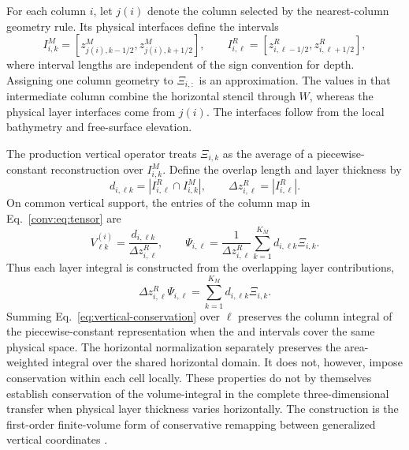 For each \ROMS column $i$, let $j(i)$ denote the \MPAS column selected
by the nearest-column geometry rule. Its physical interfaces define the
\MPAS intervals
\begin{equation}
 I^M_{i,k}=[z^M_{j(i),k-1/2},z^M_{j(i),k+1/2}],
 \qquad
 I^R_{i,\ell}=[z^R_{i,\ell-1/2},z^R_{i,\ell+1/2}],
 \label{eq:vertical-intervals}
\end{equation}
where interval lengths are independent of the sign convention for depth.
Assigning one \MPAS column geometry to $\Xi_{i,:}$ is an approximation.
The values in that intermediate column combine the horizontal stencil
through $W$, whereas the physical layer interfaces come from $j(i)$. The
\ROMS interfaces follow from the local \ROMS bathymetry and free-surface
elevation.

The production vertical operator treats $\Xi_{i,k}$ as the average of a
piecewise-constant reconstruction over $I^M_{i,k}$. Define the overlap
length and \ROMS layer thickness by
\begin{equation}
 d_{i,\ell k}=|I^R_{i,\ell}\cap I^M_{i,k}|,
 \qquad \Delta z^R_{i,\ell}=|I^R_{i,\ell}|.
 \label{eq:vertical-overlap}
\end{equation}
On common vertical support, the entries of the column map in
Eq.~\eqref{conv:eq:tensor} are
\begin{equation}
 V^{(i)}_{\ell k}=\frac{d_{i,\ell k}}{\Delta z^R_{i,\ell}},
 \qquad
 \Psi_{i,\ell}=\frac{1}{\Delta z^R_{i,\ell}}
   \sum_{k=1}^{K_M}d_{i,\ell k}\Xi_{i,k}.
 \label{eq:vertical-map}
\end{equation}
Thus each \ROMS layer integral is constructed from the overlapping
\MPAS layer contributions,
\begin{equation}
 \Delta z^R_{i,\ell}\Psi_{i,\ell}
 =\sum_{k=1}^{K_M}d_{i,\ell k}\Xi_{i,k}.
 \label{eq:vertical-conservation}
\end{equation}
Summing Eq.~\eqref{eq:vertical-conservation} over $\ell$ preserves the
column integral of the piecewise-constant \MPAS representation when the
\MPAS and \ROMS intervals cover the same physical space. The horizontal
normalization separately preserves the area-weighted integral over the
shared horizontal domain. It does not, however, impose conservation within each
cell locally. These properties do not by themselves establish
conservation of the volume-integral in the complete three-dimensional transfer
when physical layer thickness varies horizontally. The construction is the
first-order finite-volume form
of conservative remapping between generalized vertical coordinates
\citep{white2009highorder}.

